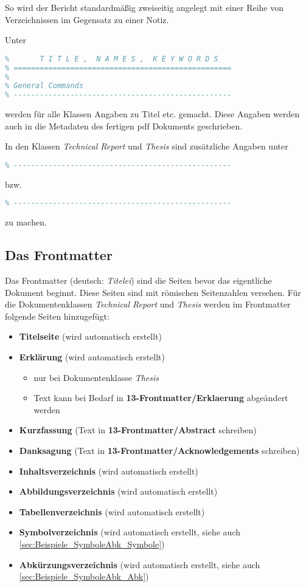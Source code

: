 So wird der Bericht standardmäßig zweiseitig angelegt mit einer Reihe von Verzeichnissen im Gegensatz zu einer Notiz.
\par 
Unter 
\begin{lstlisting}[language=tex]
% ==================================================
%       T I T L E ,  N A M E S ,  K E Y W O R D S
% ================================================== 
%
% General Commands
% --------------------------------------------------
\end{lstlisting}
werden für alle Klassen Angaben zu Titel etc. gemacht.
Diese Angaben werden auch in die Metadaten des fertigen pdf Dokuments geschrieben.
\par
In den Klassen \textit{Technical Report} und \textit{Thesis} sind zusätzliche Angaben unter
\begin{lstlisting}[language=tex]
% Specific for   T E C H N I C A L   R E P O R T
% --------------------------------------------------
\end{lstlisting}
bzw.
\begin{lstlisting}[language=tex]
% Specific for   T H E S I S
% --------------------------------------------------
\end{lstlisting}
zu machen.
%
\subsection{Das Frontmatter}
Das Frontmatter (deutsch: \textit{Titelei}) sind die Seiten bevor das eigentliche Dokument beginnt.
Diese Seiten sind mit römischen Seitenzahlen versehen.
Für die Dokumentenklassen \textit{Technical Report} und \textit{Thesis} werden im Frontmatter folgende Seiten hinzugefügt:
\begin{itemize}
    \item \textbf{Titelseite} (wird automatisch erstellt)
    \item \textbf{Erklärung} (wird automatisch erstellt)
    \begin{itemize}
        \item nur bei Dokumentenklasse \textit{Thesis}
        \item Text kann bei Bedarf in \textbf{13-Frontmatter/Erklaerung} abgeändert werden
    \end{itemize}
    \item \textbf{Kurzfassung} (Text in \textbf{13-Frontmatter/Abstract} schreiben)
    \item \textbf{Danksagung} (Text in \textbf{13-Frontmatter/Acknowledgements} schreiben) 
    \item \textbf{Inhaltsverzeichnis} (wird automatisch erstellt)
    \item \textbf{Abbildungsverzeichnis} (wird automatisch erstellt)
    \item \textbf{Tabellenverzeichnis} (wird automatisch erstellt)
    \item \textbf{Symbolverzeichnis} (wird automatisch erstellt, siehe auch \ref{sec:Beispiele_SymboleAbk_Symbole})
    \item \textbf{Abkürzungsverzeichnis} (wird automatisch erstellt, siehe auch \ref{sec:Beispiele_SymboleAbk_Abk})
\end{itemize}
%
